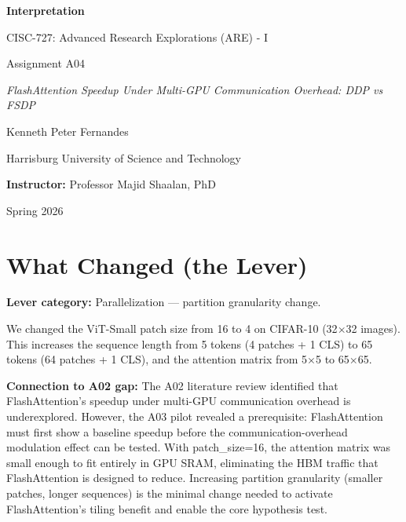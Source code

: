 \documentclass[12pt, a4paper]{article}
\begin{document}
\begin{titlepage}
    \centering
    \vspace*{2cm}
    {\LARGE \textbf{Interpretation} \par}
    \vspace{1cm}
    {\large CISC-727: Advanced Research Explorations (ARE) - I \par}
    \vspace{0.5cm}
    {\large Assignment A04 \par}
    \vspace{1.5cm}
    {\large\itshape FlashAttention Speedup Under Multi-GPU Communication Overhead: DDP vs FSDP \par}
    \vspace{2cm}
    {\large Kenneth Peter Fernandes \par}
    \vspace{0.5cm}
    {\large Harrisburg University of Science and Technology \par}
    \vspace{1cm}
    {\large \textbf{Instructor:} Professor Majid Shaalan, PhD \par}
    \vspace{1cm}
    {\large Spring 2026 \par}
\end{titlepage}

\section{What Changed (the Lever)}

\textbf{Lever category:} Parallelization --- partition granularity change.

We changed the ViT-Small patch size from 16 to 4 on CIFAR-10 (32$\times$32 images). This increases the sequence length from 5 tokens (4 patches + 1 CLS) to 65 tokens (64 patches + 1 CLS), and the attention matrix from 5$\times$5 to 65$\times$65.

\textbf{Connection to A02 gap:} The A02 literature review identified that FlashAttention's speedup under multi-GPU communication overhead is underexplored. However, the A03 pilot revealed a prerequisite: FlashAttention must first show a baseline speedup before the communication-overhead modulation effect can be tested. With patch\_size=16, the attention matrix was small enough to fit entirely in GPU SRAM, eliminating the HBM traffic that FlashAttention is designed to reduce. Increasing partition granularity (smaller patches, longer sequences) is the minimal change needed to activate FlashAttention's tiling benefit and enable the core hypothesis test.
\end{document}
